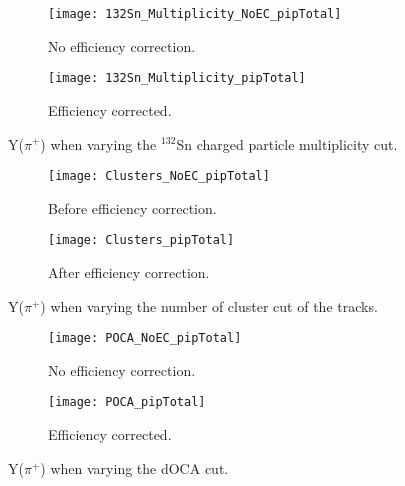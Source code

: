 \begin{figure}[!htb]
     \centering
     \begin{subfigure}[b]{\textwidth}
         \centering
         \texttt{[image: 132Sn\_Multiplicity\_NoEC\_pipTotal]}
         \caption{No efficiency correction.}
         \label{fig:pip_multCutVar_NoEC}
     \end{subfigure}
     \hfill
    \begin{subfigure}[b]{\textwidth}
         \centering
         \texttt{[image: 132Sn\_Multiplicity\_pipTotal]}
         \caption{Efficiency corrected.}
         \label{fig:pip_multCutVar}
     \end{subfigure}
     \hfill
\caption{Y($\pi^+$) when varying the ${}^{132}$Sn charged particle multiplicity cut. }
\label{fig:pip_multCutVar}
\end{figure}



\begin{figure}[!htb]
     \centering
     \begin{subfigure}[b]{\textwidth}
         \centering
         \texttt{[image: Clusters\_NoEC\_pipTotal]}
         \caption{Before efficiency correction.}
         \label{fig:pip_clustVar_NoEC}
     \end{subfigure}
     \hfill
    \begin{subfigure}[b]{\textwidth}
         \centering
         \texttt{[image: Clusters\_pipTotal]}
         \caption{After efficiency correction.}
         \label{fig:pip_clustVar_EC}
     \end{subfigure}
     \hfill
\caption{Y($\pi^+$) when varying the number of cluster cut of the tracks.}
\label{fig:pip_clustVar}
\end{figure}




\begin{figure}[!htb]
     \centering
     \begin{subfigure}[b]{\textwidth}
         \centering
         \texttt{[image: POCA\_NoEC\_pipTotal]}
         \caption{No efficiency correction.}
         \label{fig:pip_cutVarPOCA_NoEC}
     \end{subfigure}
     \hfill
    \begin{subfigure}[b]{\textwidth}
         \centering
         \texttt{[image: POCA\_pipTotal]}
         \caption{Efficiency corrected.}
         \label{fig:pip_cutVarPOCA_EC}
     \end{subfigure}
     \hfill
\caption{Y($\pi^+$) when varying the dOCA cut.}
\label{fig:pip_cutVarPOCA}
\end{figure}







